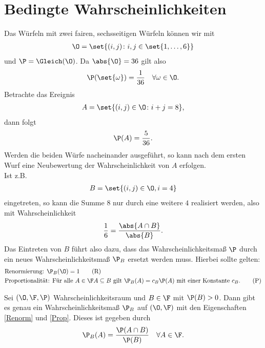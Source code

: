 \section{Bedingte Wahrscheinlichkeiten}
\begin{example}
	Das Würfeln mit zwei fairen, sechsseitigen Würfeln können wir mit 
	\begin{align}
		\O = \set{(i,j) \colon i,j \in \set{1,\dots,6}}\notag
	\end{align}
	und $\P = \Gleich(\O)$. Da $\abs{\O} = 36$ gilt also
	\begin{align}
		\P(\set{\omega}) = \frac{1}{36} \quad \forall \omega \in \O.\notag
	\end{align}
	Betrachte das Ereignis
	\begin{align}
		A = \set{(i,j) \in \O \colon i + j = 8},\notag
	\end{align}
	dann folgt
	\begin{align}
		\P(A) = \frac{5}{36}.\notag
	\end{align}
	Werden die beiden Würfe nacheinander ausgeführt, so kann nach dem ersten Wurf eine Neubewertung der Wahrscheinlichkeit von $A$ erfolgen.\\
	Ist z.B.
	\begin{align}
		B = \set{(i,j) \in \O, i = 4}\notag
	\end{align}
	eingetreten, so kann die Summe $8$ nur durch eine weitere $4$ realisiert werden, also mit Wahrscheinlichkeit
	\begin{align}
		\frac{1}{6} = \frac{\abs{A \cap B}}{\abs{B}}.\notag 
	\end{align}
	Das Eintreten von $B$ führt also dazu, dass das Wahrscheinlichkeitsmaß $\P$ durch ein neues Wahrscheinlichkeitsmaß $\P_{B}$ ersetzt werden muss. Hierbei sollte gelten:
	\begin{align}
		 &\text{Renormierung: }\P_{B}(\O) = 1\label{Renorm}\tag{R}\\
		 &\text{Proportionalität: Für alle } A \in \F \mit A \subseteq B \text{ gilt }
		 \P_{B}(A) = c_B \P(A) \text{ mit einer Konstante } c_B.\label{Prop}\tag{P}
    \end{align}
\end{example}

\begin{lemma}
	Sei $(\O, \F, \P)$ Wahrscheinlichkeitsraum und $B \in \F$ mit $\P(B) > 0$. Dann gibt es genau ein Wahrscheinlichkeitsmaß $\P_B$ auf $(\O, \F)$ mit den Eigenschaften \eqref{Renorm} und \eqref{Prop}. Dieses ist gegeben durch
	\begin{align}
		\P_{B}(A) = \frac{\P(A\cap B)}{\P(B)} \quad \forall A \in \F.\notag
	\end{align}
\end{lemma}

